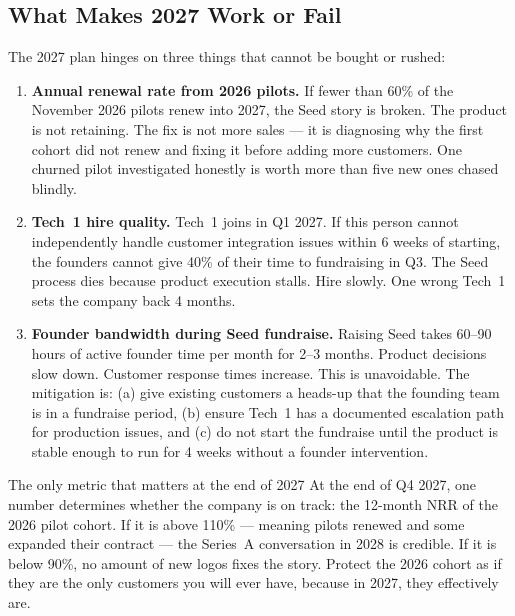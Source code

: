 \subsection*{What Makes 2027 Work or Fail}

The 2027 plan hinges on three things that cannot be bought or rushed:

\begin{enumerate}[leftmargin=1.8em, itemsep=5pt]
  \item \textbf{Annual renewal rate from 2026 pilots.}\;
    If fewer than 60\% of the November 2026 pilots renew into 2027,
    the Seed story is broken. The product is not retaining. The fix is
    not more sales --- it is diagnosing why the first cohort did not
    renew and fixing it before adding more customers. One churned pilot
    investigated honestly is worth more than five new ones chased blindly.

  \item \textbf{Tech~1 hire quality.}\;
    Tech~1 joins in Q1 2027. If this person cannot independently
    handle customer integration issues within 6 weeks of starting,
    the founders cannot give 40\% of their time to fundraising in Q3.
    The Seed process dies because product execution stalls. Hire slowly.
    One wrong Tech~1 sets the company back 4 months.

  \item \textbf{Founder bandwidth during Seed fundraise.}\;
    Raising Seed takes 60--90 hours of active founder time per month
    for 2--3 months. Product decisions slow down. Customer response
    times increase. This is unavoidable. The mitigation is:
    (a) give existing customers a heads-up that the founding team is
    in a fundraise period, (b) ensure Tech~1 has a documented
    escalation path for production issues, and (c) do not start the
    fundraise until the product is stable enough to run for 4 weeks
    without a founder intervention.
\end{enumerate}

\begin{insightbox}{The only metric that matters at the end of 2027}
At the end of Q4 2027, one number determines whether the company is on
track: the 12-month NRR of the 2026 pilot cohort. If it is above 110\%
--- meaning pilots renewed and some expanded their contract --- the
Series~A conversation in 2028 is credible. If it is below 90\%, no
amount of new logos fixes the story. Protect the 2026 cohort as if
they are the only customers you will ever have, because in 2027, they
effectively are.
\end{insightbox}

